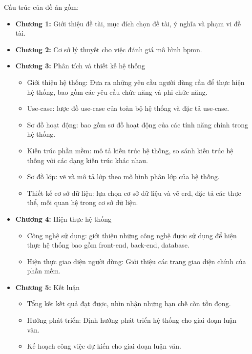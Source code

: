Cấu trúc của đồ án gồm:
\begin{itemize}
    \item \textbf{Chương 1:} Giới thiệu đề tài, mục đích chọn đề tài, ý nghĩa và phạm vi đề tài.
    \item \textbf{Chương 2:} Cơ sở lý thuyết cho việc đánh giá mô hình \acrshort{bpmn}.
    \item \textbf{Chương 3:} Phân tích và thiết kế hệ thống
          \begin{itemize}
              \item Giới thiệu hệ thống: Đưa ra những yêu cầu người dùng cần để thực hiện hệ thống,
                    bao gồm các yêu cầu chức năng và phi chức năng.
              \item Use-case: lược đồ use-case của toàn bộ hệ thống và đặc tả use-case.
              \item Sơ đồ hoạt động: bao gồm sơ đồ hoạt động của các tính năng chính trong hệ
                    thống.
            \item Kiến trúc phần mềm: mô tả kiến trúc hệ thống, so sánh kiến trúc hệ thống với
                    các dạng kiến trúc khác nhau.
              \item Sơ đồ lớp: vẽ và mô tả lớp theo mô hình phân lớp của hệ thống.
              \item Thiết kế cơ sở dữ liệu: lựa chọn cơ sở dữ liệu và vẽ \acrfull*{erd}, đặc tả các thực thể,
                    mối quan hệ trong cơ sở dữ liệu.
          \end{itemize}
    \item \textbf{Chương 4:} Hiện thực hệ thống
          \begin{itemize}
              \item Công nghệ sử dụng: giới thiệu những công nghệ được sử dụng để hiện thực hệ
                    thống bao gồm front-end, back-end, database.
              \item Hiện thực giao diện người dùng: Giới thiệu các trang giao diện chính của phần
                    mềm.
          \end{itemize}
    \item \textbf{Chương 5:} Kết luận
          \begin{itemize}
              \item Tổng kết kết quả đạt được, nhìn nhận những hạn chế còn tồn đọng.
              \item Hướng phát triển: Định hướng phát triển hệ thống cho giai đoạn luận văn.
              \item Kế hoạch công việc dự kiến cho giai đoạn luận văn.
          \end{itemize}
\end{itemize}